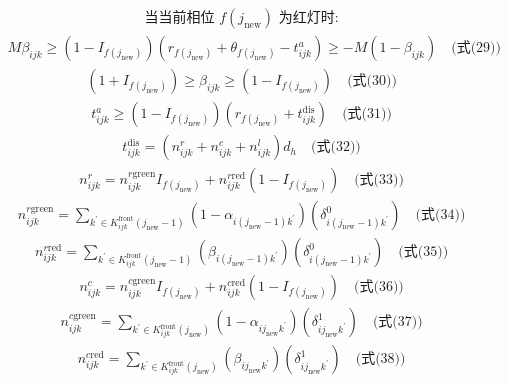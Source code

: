 \documentclass[UTF8,11pt]{ctexart}
\begin{document}
\[\begin{aligned}&\quad \text{当当前相位 } f(j_{\text{new}}) \text{ 为红灯时:}\end{aligned}\]
\[\begin{aligned}&\quad M \beta_{ijk} \geq (1 - I_{f(j_{\text{new}})})(r_{f(j_{\text{new}})} + \theta_{f(j_{\text{new}})} - t^{a}_{ijk}) \geq -M(1 - \beta_{ijk}) \quad \text{(式(29))}\end{aligned}\]
\[\begin{aligned}&\quad (1 + I_{f(j_{\text{new}})}) \geq \beta_{ijk} \geq (1 - I_{f(j_{\text{new}})}) \quad \text{(式(30))}\end{aligned}\]
\[\begin{aligned}&\quad t^{a}_{ijk} \geq (1 - I_{f(j_{\text{new}})})(r_{f(j_{\text{new}})} + t^{\text{dis}}_{ijk}) \quad \text{(式(31))}\end{aligned}\]
\[\begin{aligned}&\quad t^{\text{dis}}_{ijk} = (n^{r}_{ijk} + n^{c}_{ijk} + n^{l}_{ijk}) d_{h} \quad \text{(式(32))}\end{aligned}\]
\[\begin{aligned}&\quad n^{r}_{ijk} = n^{r \text{green}}_{ijk} I_{f(j_{\text{new}})} + n^{r \text{red}}_{ijk} (1 - I_{f(j_{\text{new}})}) \quad \text{(式(33))}\end{aligned}\]
\[\begin{aligned}&\quad n^{r \text{green}}_{ijk} = \sum_{k^{\prime} \in K^{\text{front}}_{ijk}(j_{\text{new}}-1)} (1 - \alpha_{i(j_{\text{new}}-1)k^{\prime}})(\delta^{0}_{i(j_{\text{new}}-1)k^{\prime}}) \quad \text{(式(34))}\end{aligned}\]
\[\begin{aligned}&\quad n^{r \text{red}}_{ijk} = \sum_{k^{\prime} \in K^{\text{front}}_{ijk}(j_{\text{new}}-1)} (\beta_{i(j_{\text{new}}-1)k^{\prime}})(\delta^{0}_{i(j_{\text{new}}-1)k^{\prime}}) \quad \text{(式(35))}\end{aligned}\]
\[\begin{aligned}&\quad n^{c}_{ijk} = n^{c \text{green}}_{ijk} I_{f(j_{\text{new}})} + n^{c \text{red}}_{ijk} (1 - I_{f(j_{\text{new}})}) \quad \text{(式(36))}\end{aligned}\]
\[\begin{aligned}&\quad n^{c \text{green}}_{ijk} = \sum_{k^{\prime} \in K^{\text{front}}_{ijk}(j_{\text{new}})} (1 - \alpha_{ij_{\text{new}}k^{\prime}})(\delta^{1}_{ij_{\text{new}}k^{\prime}}) \quad \text{(式(37))}\end{aligned}\]
\[\begin{aligned}&\quad n^{c \text{red}}_{ijk} = \sum_{k^{\prime} \in K^{\text{front}}_{ijk}(j_{\text{new}})} (\beta_{ij_{\text{new}}k^{\prime}})(\delta^{1}_{ij_{\text{new}}k^{\prime}}) \quad \text{(式(38))}\end{aligned}\]
\end{document}
